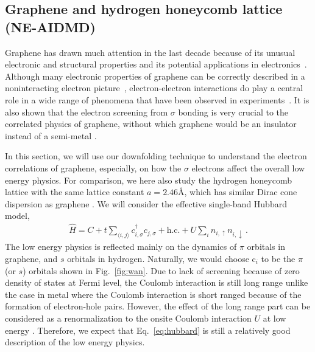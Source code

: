 \subsection{Graphene and hydrogen honeycomb lattice (NE-AIDMD)}
Graphene has drawn much attention in the last decade because of its unusual electronic and structural properties and its potential applications in electronics~\cite{Wallace1947, Novoselov2004,NovoselovNature2005, Katsnelson2006, Geim2007, Novoselov2007, neto2009, Castro2009}. 
Although many electronic properties of graphene can be correctly described in a noninteracting electron picture~\cite{Castro2009}, electron-electron interactions do play a central role in a wide range of phenomena that have been observed in experiments~\cite{Kotov2012}. It is also shown that the electron screening from $\sigma$ bonding is very crucial to the correlated physics of graphene, without which graphene would be an insulator instead of a semi-metal \cite{Zheng2016} .

In this section, we will use our downfolding technique to understand the electron correlations of graphene, especially, on how the $\sigma$ electrons affect the overall low energy physics. For comparison, we here also study the hydrogen honeycomb lattice with the same lattice constant $a=2.46$\AA, which has similar Dirac cone dispersion as graphene \cite{Zheng2016}.  We will consider the effective single-band Hubbard model, 
\begin{eqnarray}\label{eq:hubbard}
\hat{H} = C + t\sum_{\langle i,j\rangle}c_{i, \sigma}^\dagger c_{j, \sigma} + \text{h.c.} + U\sum_{i}n_{i, \uparrow}n_{i, \downarrow}\,. 
\end{eqnarray}
The low energy physics is reflected mainly on the dynamics of $\pi$ orbitals in  graphene, and $s$ orbitals in hydrogen. Naturally, we would choose c$_i$ to be the $\pi$ (or $s$) orbitals shown in Fig.~\ref{fig:wan}. Due to lack of screening because of zero density of states at Fermi level, the Coulomb interaction is still long range unlike the case in metal where the Coulomb interaction is short ranged because of the formation of electron-hole pairs. However, the effect of the long range part can be considered as a renormalization to the onsite Coulomb interaction $U$ at low energy \cite{Schuler2013, Changlani2015}. Therefore, we expect that Eq.~\eqref{eq:hubbard} is still a relatively good description of the low energy physics. 

